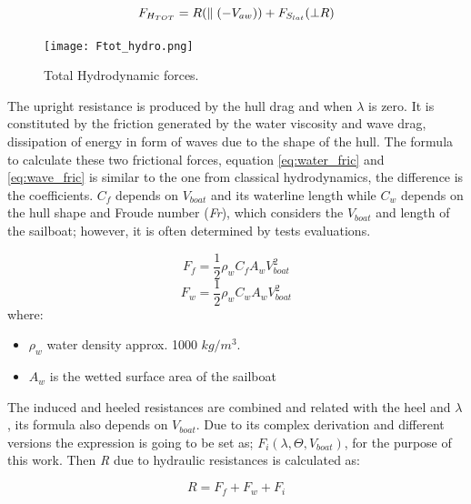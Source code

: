 \begin{equation}
    F_{H_{TOT}}=R(\parallel( -V_{aw})) + F_{S_{lat}}(\bot R )\\
\end{equation}
\begin{figure}
    \centering
    \texttt{[image: Ftot\_hydro.png]}
    \caption{Total Hydrodynamic forces. \cite{fossati2009aero}}
    \label{fig:Ftot_hydro}
\end{figure}
The upright resistance is produced by the hull drag and when $\lambda$ is zero. It is constituted by the friction generated by the water viscosity and wave drag, dissipation of energy in form of waves due to the shape of the hull. The formula to calculate these two frictional forces, equation \ref{eq:water_fric} and \ref{eq:wave_fric} is similar to the one from classical hydrodynamics, the difference is the coefficients. $C_{f}$ depends on $V_{boat}$ and its waterline length while $C_{w}$ depends on the hull shape and Froude number (\textit{Fr}), which considers the $V_{boat}$ and length of the sailboat; however, it is often determined by tests evaluations.

\begin{equation}\label{eq:water_fric}
 F_{f}=\frac{1}{2}\rho_{w} C_{f} A_{w} V_{boat}^2
\end{equation}
\begin{equation}\label{eq:wave_fric}
 F_{w}=\frac{1}{2}\rho_{w} C_{w} A_{w} V_{boat}^2
\end{equation}
where:
\begin{itemize} \label{R_symbols}
    \item $\rho_{w}$ water density approx. 1000 $kg/m^3$.
    \item $A_{w}$ is the wetted surface area of the sailboat
\end{itemize}

The induced and heeled resistances are combined and related with the heel and $\lambda$, its formula also depends on $V_{boat}$. Due to its complex derivation and different versions the expression is going to be set as; $F_{i}(\lambda,\Theta,V_{boat})$, for the purpose of this work. Then \textit{R} due to hydraulic resistances is calculated as: \par 
\begin{equation} \label{eq:R_total}
    R=F_{f}+F_{w}+F_{i}
\end{equation}

